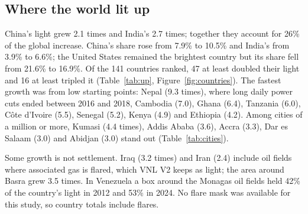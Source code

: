 \documentclass[11pt,a4paper]{article}
\begin{document}
\subsection{Where the world lit up}
China's light grew 2.1 times and India's 2.7 times; together they account for 26\% of the global increase. China's share rose from 7.9\% to 10.5\% and India's from 3.9\% to 6.6\%; the United States remained the brightest country but its share fell from 21.6\% to 16.9\%. Of the 141 countries ranked, 47 at least doubled their light and 16 at least tripled it (Table~\ref{tab:up}, Figure~\ref{fig:countries}). The fastest growth was from low starting points: Nepal (9.3 times), where long daily power cuts ended between 2016 and 2018, Cambodia (7.0), Ghana (6.4), Tanzania (6.0), Côte d'Ivoire (5.5), Senegal (5.2), Kenya (4.9) and Ethiopia (4.2). Among cities of a million or more, Kumasi (4.4 times), Addis Ababa (3.6), Accra (3.3), Dar es Salaam (3.0) and Abidjan (3.0) stand out (Table~\ref{tab:cities}).

Some growth is not settlement. Iraq (3.2 times) and Iran (2.4) include oil fields where associated gas is flared, which VNL V2 keeps as light; the area around Basra grew 3.5 times. In Venezuela a box around the Monagas oil fields held 42\% of the country's light in 2012 and 53\% in 2024. No flare mask was available for this study, so country totals include flares.
\end{document}
